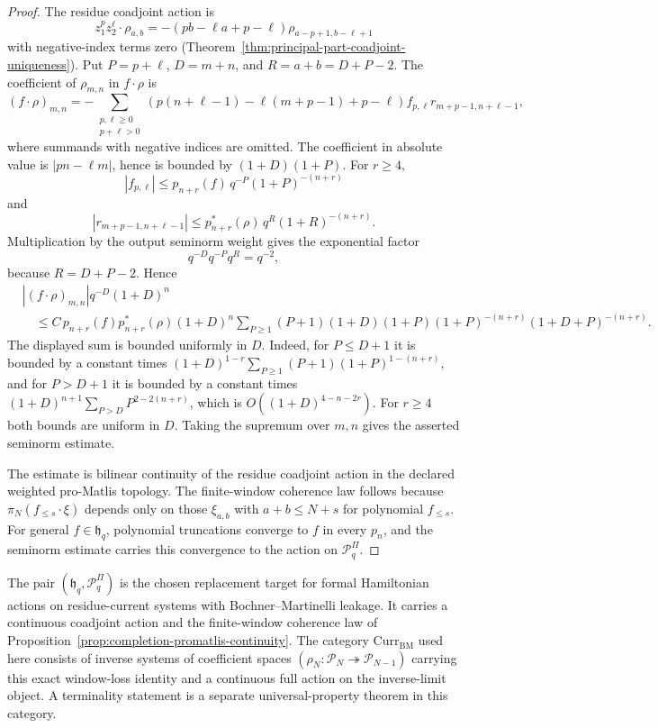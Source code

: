 \begin{proof}
The residue coadjoint action is
\[
  z_1^pz_2^\ell\cdot\rho_{a,b}
  =-(pb-\ell a+p-\ell)\rho_{a-p+1,b-\ell+1}
\]
with negative-index terms zero
(Theorem~\ref{thm:principal-part-coadjoint-uniqueness}).  Put
\(P=p+\ell\), \(D=m+n\), and
\(R=a+b=D+P-2\).  The coefficient of \(\rho_{m,n}\) in
\(f\cdot\rho\) is
\[
  (f\cdot\rho)_{m,n}
  =
  -\!\!\sum_{\substack{p,\ell\ge0\\p+\ell>0}}
  (p(n+\ell-1)-\ell(m+p-1)+p-\ell)
  f_{p,\ell}r_{m+p-1,n+\ell-1},
\]
where summands with negative indices are omitted.  The coefficient in
absolute value is \(|pn-\ell m|\), hence is bounded by
\((1+D)(1+P)\).  For \(r\ge4\),
\[
  |f_{p,\ell}|
  \le p_{n+r}(f)\,q^{-P}(1+P)^{-(n+r)}
\]
and
\[
  |r_{m+p-1,n+\ell-1}|
  \le p^*_{n+r}(\rho)\,q^{R}(1+R)^{-(n+r)} .
\]
Multiplication by the output seminorm weight gives the exponential
factor
\[
  q^{-D}q^{-P}q^R=q^{-2},
\]
because \(R=D+P-2\).  Hence
\[
\begin{aligned}
 & |(f\cdot\rho)_{m,n}|q^{-D}(1+D)^n  \\
 &\quad \le
 C\,p_{n+r}(f)p^*_{n+r}(\rho)
 (1+D)^n
 \sum_{P\ge1}
 (P+1)(1+D)(1+P)
 (1+P)^{-(n+r)}(1+D+P)^{-(n+r)} .
\end{aligned}
\]
The displayed sum is bounded uniformly in \(D\).  Indeed, for
\(P\le D+1\) it is bounded by a constant times
\((1+D)^{1-r}\sum_{P\ge1}(P+1)(1+P)^{1-(n+r)}\), and for
\(P>D+1\) it is bounded by a constant times
\((1+D)^{n+1}\sum_{P>D}P^{2-2(n+r)}\), which is
\(O((1+D)^{4-n-2r})\).
For \(r\ge4\) both bounds are uniform in \(D\).  Taking the supremum
over \(m,n\) gives the asserted seminorm estimate.

The estimate is bilinear continuity of the residue coadjoint action in
the declared weighted pro-Matlis topology.  The finite-window coherence
law follows because \(\pi_N(f_{\le s}\cdot\xi)\) depends only on those
\(\xi_{a,b}\) with \(a+b\le N+s\) for polynomial \(f_{\le s}\).  For
general \(f\in\mathfrak h_q\), polynomial truncations converge to \(f\)
in every \(p_n\), and the seminorm estimate carries this convergence to
the action on \(\mathcal P^\Pi_q\).
\end{proof}

\begin{thm}
\label{thm:completion-native-promatlis}
The pair
\((\mathfrak h_q,\mathcal P^\Pi_q)\) is the chosen replacement target
for formal Hamiltonian actions on residue-current systems with
Bochner--Martinelli leakage.  It carries a continuous coadjoint action
and the finite-window coherence law of
Proposition~\ref{prop:completion-promatlis-continuity}.  The category
\(\mathrm{Curr}_{\mathrm{BM}}\) used here consists of inverse systems
of coefficient spaces
\((\rho_N:\mathcal P_N\twoheadrightarrow\mathcal P_{N-1})\)
carrying this exact window-loss identity and a continuous full action
on the inverse-limit object.  A terminality statement is a separate
universal-property theorem in this category.
\end{thm}

